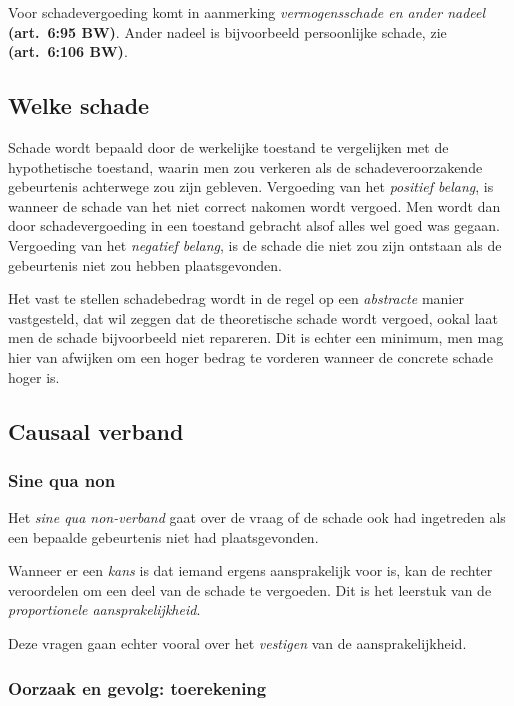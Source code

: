 \documentclass[a4paper]{article}
\newcommand{\art}[1]{\textbf{(art.~#1 BW)}\xspace}
\begin{document}
Voor schadevergoeding komt in aanmerking \emph{vermogensschade en ander
nadeel} \art{6:95}. Ander nadeel is bijvoorbeeld persoonlijke schade, zie
\art{6:106}.

\subsection{Welke schade}

Schade wordt bepaald door de werkelijke toestand te vergelijken met de
hypothetische toestand, waarin men zou verkeren als de schadeveroorzakende
gebeurtenis achterwege zou zijn gebleven. Vergoeding van het \emph{positief
belang}, is wanneer de schade van het niet correct nakomen wordt vergoed. Men
wordt dan door schadevergoeding in een toestand gebracht alsof alles wel goed
was gegaan. Vergoeding van het \emph{negatief belang}, is de schade die niet
zou zijn ontstaan als de gebeurtenis niet zou hebben plaatsgevonden.

Het vast te stellen schadebedrag wordt in de regel op een \emph{abstracte}
manier vastgesteld, dat wil zeggen dat de theoretische schade wordt vergoed,
ookal laat men de schade bijvoorbeeld niet repareren. Dit is echter een
minimum, men mag hier van afwijken om een hoger bedrag te vorderen wanneer de
concrete schade hoger is.

\subsection{Causaal verband}

\subsubsection{Sine qua non}

Het \emph{sine qua non-verband} gaat over de vraag of de schade ook had
ingetreden als een bepaalde gebeurtenis niet had plaatsgevonden.

Wanneer er een \emph{kans} is dat iemand ergens aansprakelijk voor is, kan de
rechter veroordelen om een deel van de schade te vergoeden. Dit is het
leerstuk van de \emph{proportionele aansprakelijkheid}.

Deze vragen gaan echter vooral over het \emph{vestigen} van de
aansprakelijkheid.

\subsubsection{Oorzaak en gevolg: toerekening}
\end{document}
